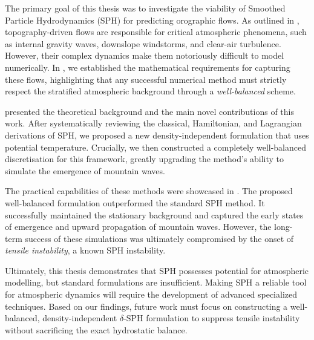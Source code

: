 \label{chap:Conclusion}

The primary goal of this thesis was to investigate the viability of Smoothed Particle Hydrodynamics (SPH) for predicting orographic flows. As outlined in , topography-driven flows are responsible for critical atmospheric phenomena, such as internal gravity waves, downslope windstorms, and clear-air turbulence. However, their complex dynamics make them notoriously difficult to model numerically. In , we established the mathematical requirements for capturing these flows, highlighting that any successful numerical method must strictly respect the stratified atmospheric background through a \emph{well-balanced} scheme. 

 presented the theoretical background and the main novel contributions of this work. After systematically reviewing the classical, Hamiltonian, and Lagrangian derivations of SPH, we proposed a new density-independent formulation that uses potential temperature. Crucially, we then constructed a completely well-balanced discretisation for this framework, greatly upgrading the method's ability to simulate the emergence of mountain waves.

The practical capabilities of these methods were showcased in . The proposed well-balanced formulation outperformed the standard SPH method. It successfully maintained the stationary background and captured the early states of emergence and upward propagation of mountain waves. However, the long-term success of these simulations was ultimately compromised by the onset of \emph{tensile instability}, a known SPH instability.

Ultimately, this thesis demonstrates that SPH possesses potential for atmospheric modelling, but standard formulations are insufficient. Making SPH a reliable tool for atmospheric dynamics will require the development of advanced specialized techniques. Based on our findings, future work must focus on constructing a well-balanced, density-independent $\delta$-SPH formulation to suppress tensile instability without sacrificing the exact hydrostatic balance.

